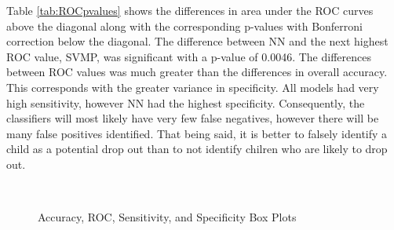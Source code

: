 \documentclass[twoside,11pt]{article}
\begin{document}
Table \ref{tab:ROCpvalues} shows the differences in area under the ROC curves
above the diagonal along with the corresponding p-values with Bonferroni
correction below the diagonal.  The difference between NN and the next highest
ROC value, SVMP, was significant with a p-value of 0.0046.  The differences
between ROC values was much greater than the differences in overall accuracy.
This corresponds with the greater variance in specificity.  All models had very
high sensitivity, however NN had the highest specificity.  Consequently, the
classifiers will most likely have very few false negatives, however there will
be many false positives identified.  That being said, it is better to falsely
identify a child as a potential drop out than to not identify chilren who are
likely to drop out.


\begin{figure}[htbp] 
  \centering
  \caption{Accuracy, ROC, Sensitivity, and Specificity Box Plots}
   \\
  \label{fig:bplot}
\end{figure}
\end{document}

